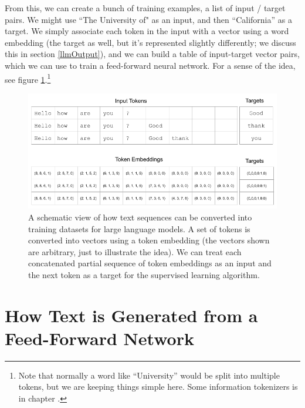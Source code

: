 From this, we can create a bunch of training examples, a list of input / target pairs. We might use ``The University of" as an input, and then ``California'' as a target.  We simply associate each token in the input with a vector using a word embedding (the target as well, but it's represented slightly differently; we discuss this in section \ref{llmOutput}), and we can build a table of input-target vector pairs, which we can use to train a feed-forward neural network.  For a sense of the idea, see figure \ref{nextWordPrediction}.\footnote{Note that normally a word like ``University'' would be split into multiple tokens, but we are keeping things simple here. Some information tokenizers is in chapter .} 

\begin{figure}[h]
\centering
\includegraphics[scale=.45]{./images/contextWindow.png}
\caption[Jeff Yoshimi]{A schematic view of how text sequences can be converted into training datasets for large language models. A set of tokens is converted into vectors using a token embedding (the vectors shown are arbitrary, just to illustrate the idea). We can treat each concatenated partial sequence of token embeddings as an input and the next token as a target for the supervised learning algorithm. }
\label{nextWordPrediction}
\end{figure}
  
\section{How Text is Generated from a Feed-Forward Network}


